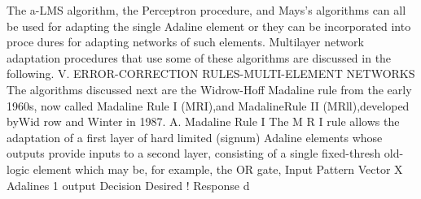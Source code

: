 \documentclass[11pt,a4paper,twocolumn]{article}
\begin{document}
The a-LMS algorithm, the Perceptron procedure, and 
Mays's algorithms can all be used for adapting the single 
Adaline element or they can be incorporated into proce
dures for adapting networks of such elements. Multilayer 
network adaptation procedures that use some of these 
algorithms are discussed in the following. 
V. ERROR-CORRECTION 
RULES-MULTI-ELEMENT NETWORKS 
The algorithms discussed next are the Widrow-Hoff 
Madaline rule from the early 1960s, now called Madaline 
Rule I (MRI),and MadalineRule II (MRll),developed byWid
row and Winter in 1987. 
A. Madaline Rule I 
The M R I  rule allows the adaptation of a first layer of hard
limited (signum) Adaline elements whose outputs provide 
inputs to a second layer, consisting of a single fixed-thresh
old-logic element which may be, for example, the OR gate, 
Input 
Pattern 
Vector 
X 
Adalines 
1 
output 
Decision 
Desired 
! 
Response 
d 
\end{document}

